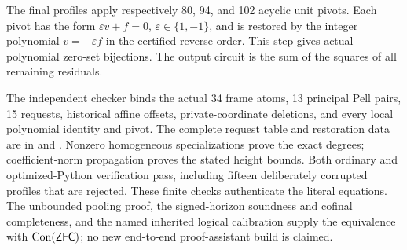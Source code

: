 The final profiles apply respectively 80, 94, and 102 acyclic unit pivots.
Each pivot has the form \(\varepsilon v+f=0\),
\(\varepsilon\in\{1,-1\}\), and is restored by the integer polynomial
\(v=-\varepsilon f\) in the certified reverse order. This step gives
actual polynomial zero-set bijections. The output circuit is the sum of
the squares of all remaining residuals.

The independent checker binds the actual 34 frame atoms, 13 principal
Pell pairs, 15 requests, historical affine offsets, private-coordinate
deletions, and every local polynomial identity and pivot. The complete
request table and restoration data are in 
and . Nonzero homogeneous specializations
prove the exact degrees; coefficient-norm propagation proves the stated
height bounds. Both ordinary and optimized-Python verification pass,
including fifteen deliberately corrupted profiles that are rejected.
These finite checks authenticate the literal equations. The unbounded
pooling proof, the signed-horizon soundness and cofinal completeness,
and the named inherited logical calibration supply the equivalence with
\(\operatorname{Con}(\mathsf{ZFC})\); no new end-to-end proof-assistant build is claimed.
